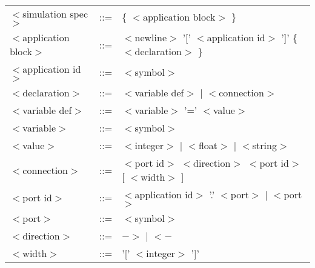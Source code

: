 \documentclass[a4paper]{report}
\begin{document}
\newcommand{\nt}[1]{$<$#1$>$}

\begin{tabular}{lcl}
\nt{simulation spec}   & ::= & \{ \nt{application block} \} \\
\nt{application block} & ::= & \nt{newline} '[' \nt{application id} ']' \{ \nt{declaration}
\} \\
\nt{application id}    & ::= & \nt{symbol} \\
\nt{declaration}       & ::= & \nt{variable def} $|$ \nt{connection} \\
\nt{variable def}      & ::= & \nt{variable} '=' \nt{value} \\
\nt{variable}	       & ::= & \nt{symbol} \\
\nt{value} 	       & ::= & \nt{integer} $|$ \nt{float} $|$ \nt{string} \\
\nt{connection}	       & ::= & \nt{port id} \nt{direction} \nt{port id} [ \nt{width} ] \\
\nt{port id}	       & ::= & \nt{application id} '.' \nt{port} $|$
\nt{port} \\
\nt{port}	       & ::= & \nt{symbol} \\
\nt{direction}	       & ::= & $->$ $|$ $<-$ \\
\nt{width}	       & ::= & '[' \nt{integer} ']' \\
\end{tabular}

\printindex
\end{document}
